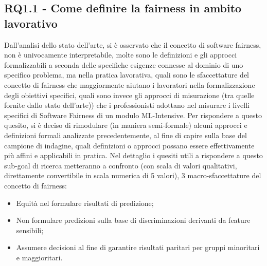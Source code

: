 	\subsection{RQ1.1 - Come definire la fairness in ambito lavorativo}
	\begin{center}
			\hspace*{-5mm}%
	\end{center}


	Dall'analisi dello stato dell'arte, si è osservato che il concetto di software fairness, non è univocamente interpretabile, molte sono le definizioni e gli approcci formalizzabili a seconda delle specifiche esigenze connesse al dominio di uno specifico problema, ma nella pratica lavorativa, quali sono le sfaccettature del concetto di fairness che maggiormente aiutano i lavoratori nella formalizzazione degli obiettivi specifici, quali sono invece gli approcci di misurazione (tra quelle fornite dallo stato dell'arte)) che i professionisti adottano nel misurare i livelli specifici di Software Fairness di un modulo ML-Intensive. Per rispondere a questo quesito, si è deciso di rimodulare (in maniera semi-formale) alcuni approcci e definizioni formali analizzate precedentemente, al fine di capire sulla base del campione di indagine, quali definizioni o approcci possano essere effettivamente più affini e applicabili in pratica. Nel dettaglio i quesiti utili a rispondere a questo sub-goal di ricerca metteranno a confronto (con scala di valori qualitativi, direttamente convertibile in scala numerica di 5 valori), 3 macro-sfaccettature del concetto di fairness:
	
	\begin{itemize}
		\item Equità nel formulare risultati di predizione;
		\item Non formulare predizioni sulla base di discriminazioni derivanti da feature sensibili;
		\item Assumere decisioni al fine di garantire risultati paritari per gruppi minoritari e maggioritari.
	\end{itemize}


